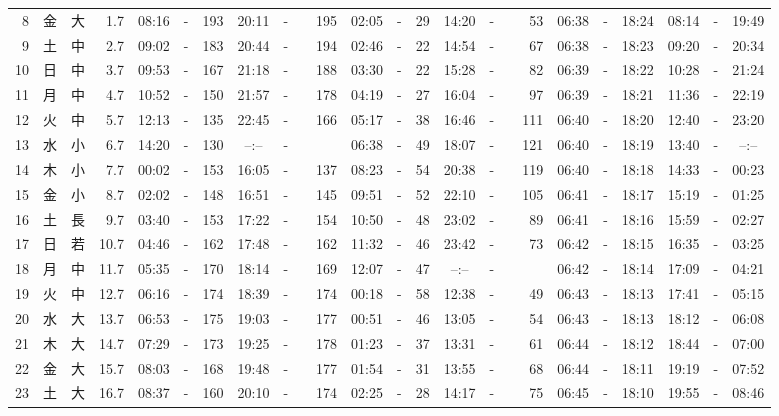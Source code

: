 \documentclass[12pt,a4j]{jsarticle}
\begin{document}
\begin{table}[htbp]
\begin{center}
{\begin{tabular}{|rc|cr|ccrccr|ccrccr|ccc|ccc|}
 8 & 金 & 大 &  1.7 &  08:16 &-& 193 &  20:11 &-& 195 &  02:05 &-&  29 &  14:20 &-&  53 & 06:38 & -& 18:24 & 08:14 & -& 19:49 \\
 9 & 土 & 中 &  2.7 &  09:02 &-& 183 &  20:44 &-& 194 &  02:46 &-&  22 &  14:54 &-&  67 & 06:38 & -& 18:23 & 09:20 & -& 20:34 \\
10 & 日 & 中 &  3.7 &  09:53 &-& 167 &  21:18 &-& 188 &  03:30 &-&  22 &  15:28 &-&  82 & 06:39 & -& 18:22 & 10:28 & -& 21:24 \\
11 & 月 & 中 &  4.7 &  10:52 &-& 150 &  21:57 &-& 178 &  04:19 &-&  27 &  16:04 &-&  97 & 06:39 & -& 18:21 & 11:36 & -& 22:19 \\
12 & 火 & 中 &  5.7 &  12:13 &-& 135 &  22:45 &-& 166 &  05:17 &-&  38 &  16:46 &-& 111 & 06:40 & -& 18:20 & 12:40 & -& 23:20 \\
13 & 水 & 小 &  6.7 &  14:20 &-& 130 &  --:-- &-&~~~~~ &  06:38 &-&  49 &  18:07 &-& 121 & 06:40 & -& 18:19 & 13:40 & -& --:-- \\
14 & 木 & 小 &  7.7 &  00:02 &-& 153 &  16:05 &-& 137 &  08:23 &-&  54 &  20:38 &-& 119 & 06:40 & -& 18:18 & 14:33 & -& 00:23 \\
15 & 金 & 小 &  8.7 &  02:02 &-& 148 &  16:51 &-& 145 &  09:51 &-&  52 &  22:10 &-& 105 & 06:41 & -& 18:17 & 15:19 & -& 01:25 \\
16 & 土 & 長 &  9.7 &  03:40 &-& 153 &  17:22 &-& 154 &  10:50 &-&  48 &  23:02 &-&  89 & 06:41 & -& 18:16 & 15:59 & -& 02:27 \\
17 & 日 & 若 & 10.7 &  04:46 &-& 162 &  17:48 &-& 162 &  11:32 &-&  46 &  23:42 &-&  73 & 06:42 & -& 18:15 & 16:35 & -& 03:25 \\
18 & 月 & 中 & 11.7 &  05:35 &-& 170 &  18:14 &-& 169 &  12:07 &-&  47 &  --:-- &-&~~~~~ & 06:42 & -& 18:14 & 17:09 & -& 04:21 \\
19 & 火 & 中 & 12.7 &  06:16 &-& 174 &  18:39 &-& 174 &  00:18 &-&  58 &  12:38 &-&  49 & 06:43 & -& 18:13 & 17:41 & -& 05:15 \\
20 & 水 & 大 & 13.7 &  06:53 &-& 175 &  19:03 &-& 177 &  00:51 &-&  46 &  13:05 &-&  54 & 06:43 & -& 18:13 & 18:12 & -& 06:08 \\
21 & 木 & 大 & 14.7 &  07:29 &-& 173 &  19:25 &-& 178 &  01:23 &-&  37 &  13:31 &-&  61 & 06:44 & -& 18:12 & 18:44 & -& 07:00 \\
22 & 金 & 大 & 15.7 &  08:03 &-& 168 &  19:48 &-& 177 &  01:54 &-&  31 &  13:55 &-&  68 & 06:44 & -& 18:11 & 19:19 & -& 07:52 \\
23 & 土 & 大 & 16.7 &  08:37 &-& 160 &  20:10 &-& 174 &  02:25 &-&  28 &  14:17 &-&  75 & 06:45 & -& 18:10 & 19:55 & -& 08:46 \\

\end{tabular}}
\end{center}
\end{table}
\end{document}

